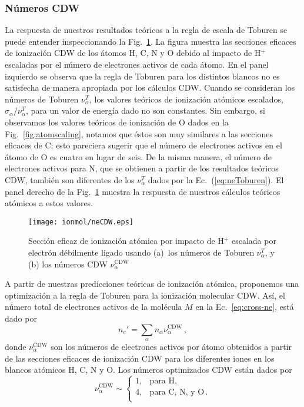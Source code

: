 \subsubsection{Números CDW}
\label{subsec:CDW}

La respuesta de nuestros resultados teóricos a la regla de escala de 
Toburen se puede entender inspeccionando la Fig.~\ref{fig:neCDW}. La 
figura muestra las secciones eficaces de ionización CDW de los átomos H, 
C, N y O debido al impacto de H$^+$ escaladas por el número de electrones 
activos de cada átomo. En el panel izquierdo se observa que la regla de 
Toburen para los distintos blancos no es satisfecha de manera apropiada 
por los cálculos CDW. Cuando se consideran los números de Toburen 
$\nu_{\alpha}^T$, los valores teóricos de ionización atómicos escalados,
$\sigma_{\alpha}/\nu_{\alpha}^T$, para un valor de energía dado no son 
constantes. Sin embargo, si observamos los valores teóricos de ionización
de O dados en la Fig.~\ref{fig:atomscaling}, notamos que éstos son muy 
similares a las secciones eficaces de C; esto pareciera sugerir que el
número de electrones activos en el átomo de O es cuatro en lugar de seis.
De la misma manera, el número de electrones activos para N, que se 
obtienen a partir de los resultados teóricos CDW, también son diferentes 
de los $\nu_{\alpha}^T$ dados por la Ec.~(\ref{eq:neToburen}). El panel 
derecho de la Fig.~\ref{fig:neCDW} muestra la respuesta de nuestros 
cálculos teóricos atómicos a estos valores.

\begin{figure}[t]
\centering
\texttt{[image: ionmol/neCDW.eps]}
\caption[Sección eficaz de ionización atómica escalada por $n_e$.]
{Sección eficaz de ionización atómica por impacto de H$^+$ escalada por 
electrón débilmente ligado usando (a)~los números de Toburen 
$\nu_{\alpha}^T$, y (b) los números CDW $\nu_{\alpha}^{\text{CDW}}$ }
\label{fig:neCDW}
\end{figure}

A partir de nuestras predicciones teóricas de ionización atómica, 
proponemos una optimización a la regla de Toburen para la ionización 
molecular CDW. Así, el número total de electrones activos de la molécula 
$M$ en la Ec.~\ref{eq:cross-ne}, está dado por 
\begin{equation}
n_e'=\sum_{\alpha}n_{\alpha}\nu_{\alpha}^{\text{CDW}}\,,
\end{equation}
donde $\nu_{\alpha}^{\text{CDW}}$ son los números de electrones activos 
por átomo obtenidos a partir de las secciones eficaces de ionización CDW 
para los diferentes iones en los blancos atómicos H, C, N y O. Los 
números optimizados CDW están dados por
\begin{equation}
\nu_{\alpha }^{\text{CDW}} \sim\left\{ 
\begin{array}{ll}
1, & \text{para H,} \\
4, & \text{para C, N, y O}\,. \\ 
\end{array}
\right. 
\label{eq:scalingCDW}
\end{equation}

